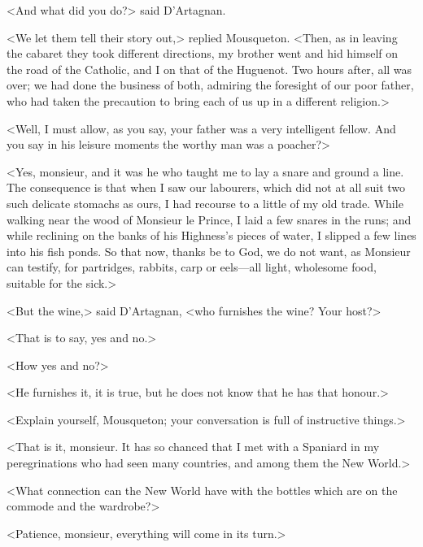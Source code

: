 <And what did you do?> said D'Artagnan. 

<We let them tell their story out,> replied Mousqueton. <Then, as in leaving the cabaret they took different directions, my brother went and hid himself on the road of the Catholic, and I on that of the Huguenot. Two hours after, all was over; we had done the business of both, admiring the foresight of our poor father, who had taken the precaution to bring each of us up in a different religion.> 

<Well, I must allow, as you say, your father was a very intelligent fellow. And you say in his leisure moments the worthy man was a poacher?> 

<Yes, monsieur, and it was he who taught me to lay a snare and ground a line. The consequence is that when I saw our labourers, which did not at all suit two such delicate stomachs as ours, I had recourse to a little of my old trade. While walking near the wood of Monsieur le Prince, I laid a few snares in the runs; and while reclining on the banks of his Highness's pieces of water, I slipped a few lines into his fish ponds. So that now, thanks be to God, we do not want, as Monsieur can testify, for partridges, rabbits, carp or eels—all light, wholesome food, suitable for the sick.> 

<But the wine,> said D'Artagnan, <who furnishes the wine? Your host?> 

<That is to say, yes and no.> 

<How yes and no?> 

<He furnishes it, it is true, but he does not know that he has that honour.> 

<Explain yourself, Mousqueton; your conversation is full of instructive things.> 

<That is it, monsieur. It has so chanced that I met with a Spaniard in my peregrinations who had seen many countries, and among them the New World.> 

<What connection can the New World have with the bottles which are on the commode and the wardrobe?> 

<Patience, monsieur, everything will come in its turn.> 


